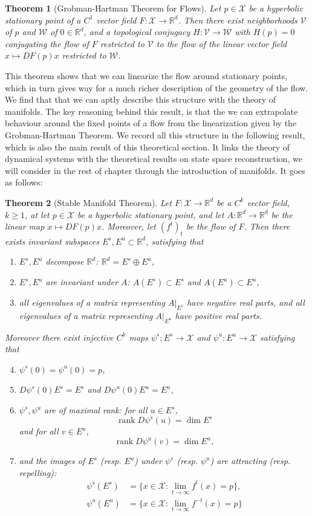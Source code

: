 \documentclass[11pt, a4paper]{memoir}
\theoremstyle{break}
\newtheorem{thm}{Theorem}
\theoremstyle{break}
\theoremstyle{nonumberplain}
\newcommand{\mR}{\mathbb{R}}
\DeclareMathOperator{\rank}{rank}
\begin{document}
\begin{thm}[Grobman-Hartman Theorem for Flows]
Let $p\in \mathcal{X}$ be a hyperbolic stationary point of a $C^1$ vector field $F:\mathcal{X}\to\mR^d$. Then there exist neighborhoods $\mathcal{V}$ of $p$ and $\mathcal{W}$ of $0\in \mR^d$, and a topological conjugacy $H:\mathcal{V}\to\mathcal{W}$ with $H(p)=0$ conjugating the flow of $F$ restricted to $\mathcal{V}$ to the flow of the linear vector field $x\mapsto DF(p)x$ restricted to $\mathcal{W}$.
\end{thm}
This theorem shows that we can linearize the flow around stationary points, which in turn gives way for a much richer description of the geometry of the flow. We find that that we can aptly describe this structure with the theory of manifolds. The key reasoning behind this result, is that the we can extrapolate behaviour around the fixed points of a flow from the linearization given by the Grobman-Hartman Theorem. We record all this structure in the following result, which is also the main result of this theoretical section. It links the theory of dynamical systems with the theoretical results on state space reconstruction, we will consider in the rest of chapter through the introduction of manifolds. It goes as follows:
\begin{thm}[Stable Manifold Theorem]\label{stable}
Let $F:\mathcal{X}\to \mR^d$ be a $C^k$ vector field, $k\geqslant 1$, at let $p\in \mathcal{X}$ be a hyperbolic stationary point, and let $A:\mR^d\to\mR^d$ be the linear map $x\mapsto DF(p)x$. Moreover, let $(f^t)_t$ be the flow of $F$. Then there exists invariant subspaces $E^s,E^u\subset\mR^d$, satisfying that 
\begin{enumerate}[label=(\roman*)]
	\item $E^s,E^u$ decompose $\mR^d$: $\mR^d=E^s\oplus E^u$,
	\item $E^s,E^u$ are invariant under $A$: $A(E^s)\subset E^s$ and $A(E^u)\subset E^u$,
	\item all eigenvalues of a matrix representing $A|_{E^s}$ have negative real parts, and all eigenvalues of a matrix representing $A|_{E^u}$ have positive real parts.
\end{enumerate}
Moreover there exist injective $C^k$ maps $\psi^s: E^s\to \mathcal{X}$ and $\psi^u:E^u\to\mathcal{X}$ satisfying that
\begin{enumerate}[label=(\roman*)]
\setcounter{enumi}{3}
	\item $\psi^s(0)=\psi^u(0)=p$,
	\item $D\psi^s(0)E^s=E^s$ and  $D\psi^u(0)E^u=E^u$,
 \item $\psi^s,\psi^u$ are of maximal rank: for all $u\in E^s$, $$\rank D\psi^s(u)=\dim E^s$$ and for all $v\in E^u$, $$\rank D\psi^u(v)=\dim E^u,$$
 \item and the images of $E^s$ (resp. $E^u$) under $\psi^s$ (resp. $\psi^u$) are attracting (resp. repelling):
 \begin{align*}
  \psi^s(E^s)&=\{x\in \mathcal{X}:\lim_{t\to\infty}f^t(x)=p\},\\
 \psi^u(E^u)&=\{x\in \mathcal{X}:\lim_{t\to\infty}f^{-t}(x)=p\}
 \end{align*}
\end{enumerate}
\end{thm}
\end{document}
